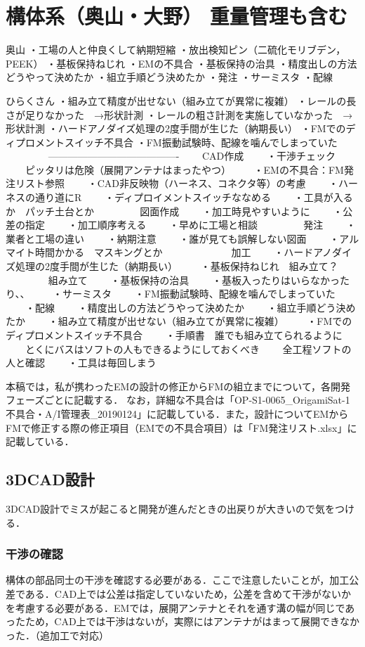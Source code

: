\section{構体系（奥山・大野） 重量管理も含む}

奥山
・工場の人と仲良くして納期短縮
・放出検知ピン（二硫化モリブデン，PEEK）
・基板保持ねじれ
・EMの不具合
・基板保持の治具
・精度出しの方法どうやって決めたか
・組立手順どう決めたか
・発注
・サーミスタ
・配線

ひらくさん
・組み立て精度が出せない（組み立てが異常に複雑）
・レールの長さが足りなかった　→形状計測
・レールの粗さ計測を実施していなかった　→形状計測
・ハードアノダイズ処理の2度手間が生じた（納期長い）
・FMでのディプロメントスイッチ不具合
・FM振動試験時、配線を噛んでしまっていた
　　
　　----------------------------------------
　　CAD作成
　　・干渉チェック
　　ピッタリは危険（展開アンテナはまったやつ）
　　・EMの不具合：FM発注リスト参照
　　・CAD非反映物（ハーネス、コネクタ等）の考慮
　　・ハーネスの通り道にR
　　・ディプロイメントスイッチななめる
　　・工具が入るか　パッチ土台とか
　　
　　図面作成
　　・加工時見やすいように
　　・公差の指定
　　・加工順序考える
　　・早めに工場と相談
　　
　　発注
　　・業者と工場の違い
　　・納期注意
　　・誰が見ても誤解しない図面
　　・アルマイト時間かかる　マスキングとか
　　
　　
　　加工
　　・ハードアノダイズ処理の2度手間が生じた（納期長い）
　　・基板保持ねじれ　組み立て？
　　
　　組み立て
　　・基板保持の治具
　　・基板入ったりはいらなかったり、、
　　・サーミスタ
　　・FM振動試験時、配線を噛んでしまっていた
　　・配線
　　・精度出しの方法どうやって決めたか
　　・組立手順どう決めたか
　　・組み立て精度が出せない（組み立てが異常に複雑）
　　・FMでのディプロメントスイッチ不具合
　　・手順書　誰でも組み立てられるように
　　とくにバスはソフトの人もできるようにしておくべき
　　全工程ソフトの人と確認
　　・工具は毎回しまう
　　
\fi

本稿では，私が携わったEMの設計の修正からFMの組立までについて，各開発フェーズごとに記載する．
なお，詳細な不具合は「OP-S1-0065\_OrigamiSat-1不具合・A/I管理表\_20190124」に記載している．また，設計についてEMからFMで修正する際の修正項目（EMでの不具合項目）は「FM発注リスト.xlsx」に記載している．


\subsection{3DCAD設計}
3DCAD設計でミスが起こると開発が進んだときの出戻りが大きいので気をつける．
\subsubsection{干渉の確認}
構体の部品同士の干渉を確認する必要がある．ここで注意したいことが，加工公差である．CAD上では公差は指定していないため，公差を含めて干渉がないかを考慮する必要がある．EMでは，展開アンテナとそれを通す溝の幅が同じであったため，CAD上では干渉はないが，実際にはアンテナがはまって展開できなかった．（追加工で対応）
